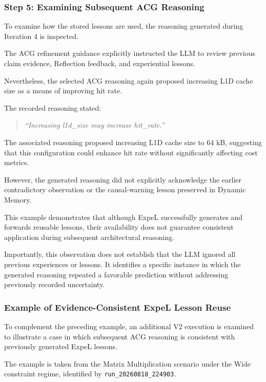 \subsubsection{Step 5: Examining Subsequent ACG Reasoning}

To examine how the stored lessons are
used, the reasoning generated during
Iteration 4 is inspected.

The ACG refinement guidance explicitly
instructed the LLM to review previous
claim evidence, Reflection feedback,
and experiential lessons.

Nevertheless, the selected ACG reasoning
again proposed increasing L1D cache size
as a means of improving hit rate.

The recorded reasoning stated:

\begin{quote}
\emph{``Increasing l1d\_size may increase
hit\_rate.''}
\end{quote}

The associated reasoning proposed
increasing L1D cache size to 64 kB,
suggesting that this configuration
could enhance hit rate without
significantly affecting cost metrics.

However, the generated reasoning did
not explicitly acknowledge the earlier
contradictory observation or the
causal-warning lesson preserved
in Dynamic Memory.

This example demonstrates that although
ExpeL successfully generates and
forwards reusable lessons, their
availability does not guarantee
consistent application during subsequent
architectural reasoning.

Importantly, this observation does not
establish that the LLM ignored all
previous experiences or lessons.
It identifies a specific instance
in which the generated reasoning
repeated a favorable prediction
without addressing previously
recorded uncertainty.


\subsubsection{Example of Evidence-Consistent ExpeL Lesson Reuse}
\label{app:p4_v2_successful_reuse}

To complement the preceding example, an additional
V2 execution is examined to illustrate a case in
which subsequent ACG reasoning is consistent with
previously generated ExpeL lessons.

The example is taken from the Matrix Multiplication
scenario under the Wide constraint regime,
identified by \texttt{run\_20260818\_224903}.

